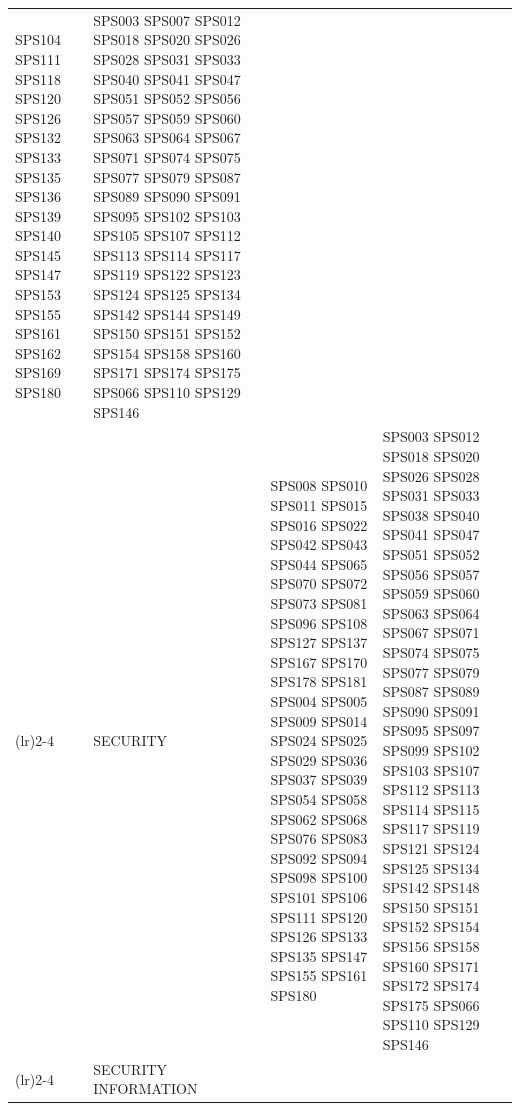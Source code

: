 \begin{table}[htbp]
\begin{tabularx}{\textwidth}{p{0.8cm}p{2.5cm}>{\raggedright\arraybackslash}X>{\raggedright\arraybackslash}X>{\raggedright\arraybackslash}X}
																		 SPS104 SPS111 SPS118 SPS120 SPS126 SPS132 
																		 SPS133 SPS135 SPS136 SPS139 SPS140 SPS145 
																		 SPS147 SPS153 SPS155 SPS161 SPS162 SPS169 
																		 SPS180              						    & SPS003 SPS007 SPS012 SPS018 SPS020 SPS026 
																													      SPS028 SPS031 SPS033 SPS040 SPS041 SPS047 
																														  SPS051 SPS052 SPS056 SPS057 SPS059 SPS060 
																														  SPS063 SPS064 SPS067 SPS071 SPS074 SPS075 
																														  SPS077 SPS079 SPS087 SPS089 SPS090 SPS091 
																														  SPS095 SPS102 SPS103 SPS105 SPS107 SPS112 
																														  SPS113 SPS114 SPS117 SPS119 SPS122 SPS123 
																														  SPS124 SPS125 SPS134 SPS142 SPS144 SPS149 
																														  SPS150 SPS151 SPS152 SPS154 SPS158 SPS160 
																														  SPS171 SPS174 SPS175 SPS066 SPS110 SPS129 
																														  SPS146       									 \\
		\addlinespace[0.3em]
		\cmidrule(lr){2-4}
		                                     & SECURITY          	   & SPS008 SPS010 SPS011 SPS015 SPS016 SPS022 
																		 SPS042 SPS043 SPS044 SPS065 SPS070 SPS072 
																		 SPS073 SPS081 SPS096 SPS108 SPS127 SPS137 
																		 SPS167 SPS170 SPS178 SPS181 SPS004 SPS005 
																		 SPS009 SPS014 SPS024 SPS025 SPS029 SPS036 
																		 SPS037 SPS039 SPS054 SPS058 SPS062 SPS068 
																		 SPS076 SPS083 SPS092 SPS094 SPS098 SPS100 
																		 SPS101 SPS106 SPS111 SPS120 SPS126 SPS133 
																		 SPS135 SPS147 SPS155 SPS161 SPS180           & SPS003 SPS012 SPS018 SPS020 SPS026 SPS028 
																													   	 SPS031 SPS033 SPS038 SPS040 SPS041 SPS047 
																														 SPS051 SPS052 SPS056 SPS057 SPS059 SPS060 
																														 SPS063 SPS064 SPS067 SPS071 SPS074 SPS075 
																														 SPS077 SPS079 SPS087 SPS089 SPS090 SPS091 
																														 SPS095 SPS097 SPS099 SPS102 SPS103 SPS107 
																														 SPS112 SPS113 SPS114 SPS115 SPS117 SPS119 
																														 SPS121 SPS124 SPS125 SPS134 SPS142 SPS148 
																														 SPS150 SPS151 SPS152 SPS154 SPS156 SPS158 
																														 SPS160 SPS171 SPS172 SPS174 SPS175 SPS066 
																														 SPS110 SPS129 SPS146                     									 \\
		\addlinespace[0.3em]
		\cmidrule(lr){2-4}
		                                     & SECURITY INFORMATION 

\end{tabularx}
\end{table}
